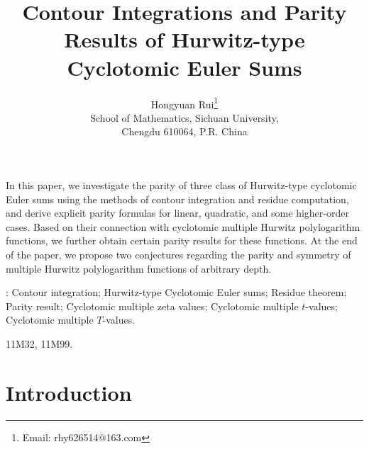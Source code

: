 \documentclass[11pt]{article}
\let\oldsection\section
\renewcommand\section{\setcounter{equation}{0}\oldsection}
\theoremstyle{plain}
\theoremstyle{definition}
\begin{document}
\title{\bf Contour Integrations and Parity Results of Hurwitz-type Cyclotomic Euler Sums}
\author{
{Hongyuan Rui\thanks{Email: rhy626514@163.com}}\\[1mm]
\small School of Mathematics, Sichuan University,\\ \small Chengdu 610064, P.R. China\\
}

\date{}
\maketitle

 In this paper, we investigate the parity of three class of Hurwitz-type cyclotomic Euler sums using the methods of contour integration and residue computation, and derive explicit parity formulas for linear, quadratic, and some higher-order cases. Based on their connection with cyclotomic multiple Hurwitz polylogarithm functions, we further obtain certain parity results for these functions. At the end of the paper, we propose two conjectures regarding the parity and symmetry of multiple Hurwitz polylogarithm functions of arbitrary depth.
\medskip

: Contour integration; Hurwitz-type Cyclotomic Euler sums; Residue theorem; Parity result; Cyclotomic multiple zeta values; Cyclotomic multiple $t$-values; Cyclotomic multiple $T$-values.
\medskip

 11M32, 11M99.



\section{Introduction}
\end{document}
